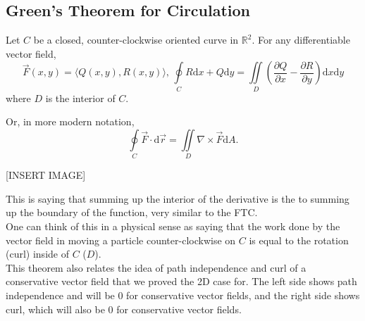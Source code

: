 \subsection{Green's Theorem for Circulation}
\begin{theorem}
	Let $C$ be a closed, counter-clockwise oriented curve in $\mathbb{R}^2$. For any differentiable vector field,
	\begin{equation*}
		\vec{F}(x,y) = \langle Q(x,y), R(x,y) \rangle \text{, } \oint\limits_{C}{R\mathrm{d}x + Q\mathrm{d}y} = \iint\limits_{D}{\left(\frac{\partial Q}{\partial x} - \frac{\partial R}{\partial y}\right)\mathrm{d}x\mathrm{d}y}
	\end{equation*}
	where $D$ is the interior of $C$.
\end{theorem}
\noindent
Or, in more modern notation,
\begin{equation*}
	\oint\limits_{C}{\vec{F} \cdot \mathrm{d}\vec{r}} = \iint\limits_{D}{\nabla\times\vec{F}\mathrm{d}A}.
\end{equation*}

[INSERT IMAGE]

\noindent
This is saying that summing up the interior of the derivative is the to summing up the boundary of the function, very similar to the FTC.\\
One can think of this in a physical sense as saying that the work done by the vector field in moving a particle counter-clockwise on $C$ is equal to the rotation (curl) inside of  $C$ ($D$).\\
This theorem also relates the idea of path independence and curl of a conservative vector field that we proved the 2D case for. The left side shows path independence and will be 0 for conservative vector fields, and the right side shows curl, which will also be 0 for conservative vector fields.

